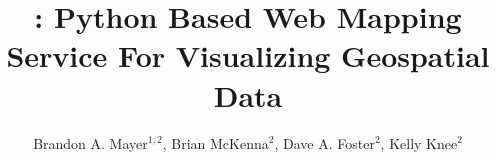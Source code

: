 \documentclass[noback,noborder,portrait,twocolumn]{cuposter}
\begin{document}

\newcommand{\figspace}{\vskip 20pt plus 5pt minus 5pt}
\newcommand{\captionspace}{\vskip 10pt plus 5pt minus 5pt}


\newcommand{\getIncFigcounter}{\stepcounter{figcounter}\thefigcounter}
\title{\sciwms{}: Python Based Web Mapping Service For Visualizing Geospatial Data}

\newcommand{\getIncTablecounter}{\stepcounter{tablecounter}\thetablecounter}

\author{Brandon A. Mayer$^{1,2}$, Brian McKenna$^{2}$, Dave A. Foster$^{2}$, Kelly Knee$^{2}$}
\address{Brown University, Providence RI, USA$^{1}$; RPS-ASA, South Kingston RI, USA$^{2}$}

\makeposter
\end{document}
